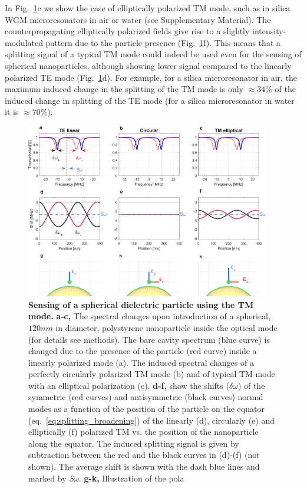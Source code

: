 \documentclass[journal=jacsat,manuscript=article]{achemso}
\begin{document}
In Fig.~\ref{fig:TETMcompare}c we show the case of elliptically polarized TM mode, such as in silica WGM microresonators in air or water (see Supplementary Material). The counterpropagating elliptically polarized fields give rise to a slightly intensity-modulated pattern due to the particle presence (Fig.~\ref{fig:TETMcompare}f). This means that a splitting signal of a typical TM mode could indeed be used even for the sensing of spherical nanoparticles, although showing lower signal compared to the linearly polarized TE mode (Fig.~\ref{fig:TETMcompare}d). For example, for a silica microresonator in air, the maximum induced change in the splitting of the TM mode is only $\approx 34\%$ of the induced change in splitting of the TE mode (for a silica microresonator in water it is $\approx 70 \%$).

\begin{figure}[H]
\centering
                \includegraphics[trim=0.0cm 0.0cm 0.0cm 0.0cm, clip, width=0.95\textwidth]{Images/TMspherical_modified_3.png}\quad
             \caption{\textbf{Sensing of a spherical dielectric particle using the TM mode.} \textbf{a-c,} The spectral changes upon introduction of a spherical, $120nm$ in diameter, polystyrene nanoparticle inside the optical mode (for details see methods). The bare cavity spectrum (blue curve) is changed due to the presence of the particle (red curve) inside a linearly polarized mode (a). The induced spectral changes of a perfectly circularly polarized TM mode (b) and of typical TM mode with an elliptical polarization (c). \textbf{d-f,} show the shifts ($\delta \omega$) of the symmetric (red curves) and antisymmetric (black curves) normal modes as a function of the position of the particle on the equator (eq.~\ref{eq:splitting_broadening}) of the linearly (d), circularly (e) and elliptically (f) polarized TM vs. the position of the nanoparticle along the equator.  The induced splitting signal is given by subtraction between the red and the black curves in (d)-(f) (not shown). The average shift is shown with the dash blue lines and marked by \textit{S}$\omega$. \textbf{g-k,} Illustration of the pola
						\label{fig:TETMcompare}}
\end{figure}
\end{document}
